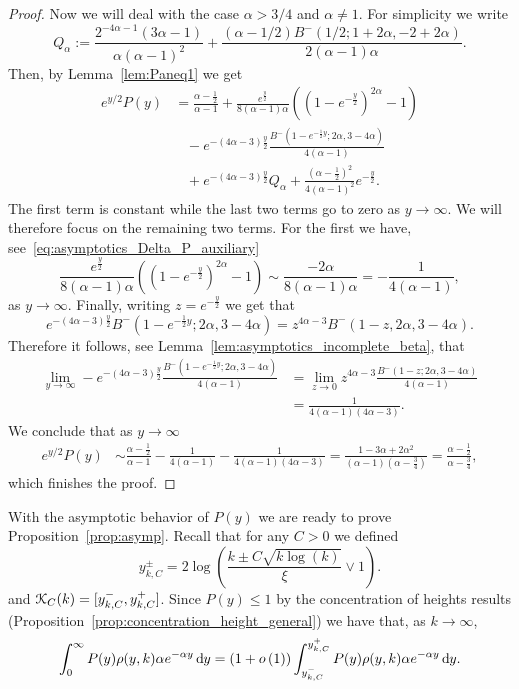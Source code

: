 \begin{proof}
Now we will deal with the case $\alpha > 3/4$ and $\alpha \not = 1$. For simplicity we write
\[
	Q_\alpha := \frac{2^{-4 \alpha-1} (3 \alpha - 1)}{\alpha (\alpha - 1)^2} 
		+ \frac{(\alpha - 1/2 ) B^-(1/2; 1 + 2 \alpha, -2 + 2 \alpha)}{2(\alpha - 1) \alpha}.
\]
Then, by Lemma~\ref{lem:Paneq1} we get
\begin{align*}
	e^{y/2} P(y) &= \frac{\alpha - \frac{1}{2}}{\alpha - 1} 
		+ \frac{e^{\frac{y}{2}}}{8(\alpha - 1)\alpha}\left(\left(1 - e^{-\frac{y}{2}}\right)^{2\alpha}-1\right)\\
	&\hspace{10pt}- e^{-(4\alpha - 3)\frac{y}{2}}\frac{B^-(1 - e^{-\frac{1}{2}y}; 2 \alpha, 3 - 4 \alpha)}{4 (\alpha - 1)}\\
	&\hspace{10pt}+ e^{-(4\alpha - 3)\frac{y}{2}}Q_\alpha + \frac{(\alpha-\frac{1}{2})^2}{4(\alpha-1)^2} e^{-\frac{y}{2}}.
\end{align*}
The first term is constant while the last two terms go to zero as $y \to \infty$. We will therefore focus on the remaining two terms. For the first we have, see~\eqref{eq:asymptotics_Delta_P_auxiliary} 
\[
	\frac{e^{\frac{y}{2}}}{8(\alpha - 1)\alpha}\left(\left(1 - e^{-\frac{y}{2}}\right)^{2\alpha}-1\right) 
	\sim \frac{-2\alpha}{8(\alpha - 1)\alpha} = -\frac{1}{4(\alpha -1)},
\]
as $y \to \infty$. Finally, writing $z = e^{-\frac{y}{2}}$ we get that
\[
	e^{-(4\alpha - 3)\frac{y}{2}} B^-(1 - e^{-\frac{1}{2}y}; 2 \alpha, 3 - 4 \alpha)
	= z^{4\alpha - 3} B^-(1 - z, 2 \alpha, 3 - 4 \alpha).
\]
Therefore it follows, see Lemma~\ref{lem:asymptotics_incomplete_beta}, that
\begin{align*}
	\lim_{y \to \infty} - e^{-(4\alpha - 3)\frac{y}{2}}
		\frac{B^-(1 - e^{-\frac{1}{2}y}; 2 \alpha, 3 - 4 \alpha)}{4 (\alpha - 1)}
	&= \lim_{z \to 0} z^{4\alpha - 3} \frac{B^-(1 - z; 2 \alpha, 3 - 4 \alpha)}{4(\alpha - 1)}\\
	&= \frac{1}{4(\alpha - 1)(4\alpha - 3)}.
\end{align*}
We conclude that as $y \to \infty$
\begin{align*}
	e^{y/2} P(y) 
	&\sim \frac{\alpha - \frac{1}{2}}{\alpha - 1} -\frac{1}{4(\alpha -1)} - \frac{1}{4(\alpha - 1)(4\alpha - 3)}
	= \frac{1 - 3\alpha + 2 \alpha^2}{(\alpha - 1)(\alpha - \frac{3}{4})} 
	= \frac{\alpha - \frac{1}{2}}{\alpha - \frac{3}{4}},
\end{align*}
which finishes the proof.
\end{proof}

With the asymptotic behavior of $P(y)$ we are ready to prove Proposition~\ref{prop:asymp}. Recall that for any $C > 0$ we defined
\[
	y_{k,C}^\pm = 2 \log\left(\frac{k \pm C \sqrt{k \log(k)}}{\xi} \vee 1\right).
\] 
and ${\mathcal K}_C(k) = [y_{k,C}^-, y_{k,C}^+]$. Since $P(y) \le 1$ by the concentration of heights results (Proposition~\ref{prop:concentration_height_general}) we have that, as $k \to \infty$,
\begin{equation}\label{eq:asymptotics_average_clustering_concentration}
	\int_0^\infty P(y) \rho(y,k) \alpha e^{-\alpha y} \operatorname{\mathrm{d}\hspace{-2pt}} y
	= (1+o\left(1\right)) \int_{y_{k,C}^-}^{y_{k,C}^+} P(y) \rho(y,k) \alpha e^{-\alpha y} \operatorname{\mathrm{d}\hspace{-2pt}} y.
\end{equation}

